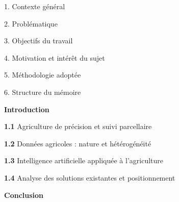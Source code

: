 \documentclass[12pt,a4paper]{report}
\begin{document}
	\noindent
	\colorbox{bleuPrincipal}{%
		\parbox{\linewidth}{%
			\vspace{3pt}
			\hfill{\color{white}\bfseries }
			\vspace{3pt}
		}%
	}
	
	\vspace{3pt}
	\begin{list}{}{%
			\setlength{\leftmargin}{1.5em}
			\setlength{\itemsep}{2pt}
		}
		\item1. Contexte g\'en\'eral  
		\item 2. Probl\'ematique  
		\item 3. Objectifs du travail  
		\item 4. Motivation et int\'er\^et du sujet 
		\item 5. M\'ethodologie adopt\'ee 
		\item 6. Structure du m\'emoire 
	\end{list}
	
	\vspace{0.8cm}
	
	
	\noindent
	\colorbox{bleuPrincipal}{%
		\parbox{\linewidth}{%
			\vspace{3pt}
			\hfill{\color{white}\bfseries }
			\vspace{3pt}
		}%
	}
	
	\vspace{3pt}
	\begin{list}{}{%
			\setlength{\leftmargin}{0pt}
			\setlength{\itemsep}{2pt}
		}
		\item \textbf{Introduction} \dotfill 
		
		\vspace{4pt}
		\item \textbf{1.1} \quad Agriculture de pr\'ecision et suivi parcellaire \dotfill 
		
		\vspace{4pt}
		\item \textbf{1.2} \quad Donn\'ees agricoles : nature et h\'et\'erog\'en\'eit\'e \dotfill 
		
		\vspace{4pt}
		\item \textbf{1.3} \quad Intelligence artificielle appliqu\'ee \`a l'agriculture \dotfill 
		
		\vspace{4pt}
		\item \textbf{1.4} \quad Analyse des solutions existantes et positionnement \dotfill 
		
		
		\vspace{4pt}
		\item \textbf{Conclusion} \dotfill 
	\end{list}
	
\end{document}
